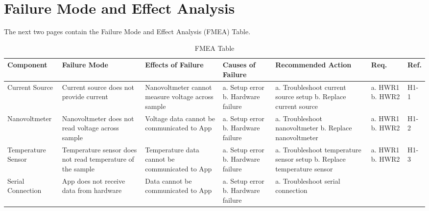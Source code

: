 \documentclass{article}
\begin{document}
\section{Failure Mode and Effect Analysis}
The next two pages contain the Failure Mode and Effect Analysis (FMEA) Table.

\begin{landscape}
\begin{table}[h]
  \centering
  \caption{FMEA Table}
  \label{my-label}
  \begin{tabular}{|P{20mm}|P{30mm}|P{30mm}|P{30mm}|P{35mm}|P{20mm}|P{10mm}|}
    \hline
    \textbf{Component} & \textbf{Failure Mode} & \textbf{Effects of Failure} & \textbf{Causes of Failure} & \textbf{Recommended Action} & \textbf{Req.} & \textbf{Ref.}      \\ \hline
    Current Source
    & Current source does not provide current 
    & Nanovoltmeter cannot measure voltage across sample
    & a. Setup error \newline
      b. Hardware failure
    & a. Troubleshoot current source setup \newline
      b. Replace current source
    & a. HWR1 \newline
      b. HWR2
    & H1-1      \\ \hline
    Nanovoltmeter
    & Nanovoltmeter does not read voltage across sample
    & Voltage data cannot be communicated to App
    & a. Setup error \newline
      b. Hardware failure
    & a. Troubleshoot nanovoltmeter \newline
      b. Replace nanovoltmeter
    & a. HWR1 \newline
      b. HWR2
    & H1-2      \\ \hline
    Temperature Sensor
    & Temperature sensor does not read temperature of the sample
    & Temperature data cannot be communicated to App
    & a. Setup error \newline
      b. Hardware failure
    & a. Troubleshoot temperature sensor setup \newline
      b. Replace temperature sensor 
    & a. HWR1 \newline
      b. HWR2
    & H1-3    \\ \hline
    Serial Connection
    & App does not receive data from hardware
    & Data cannot be communicated to App
    & a. Setup error \newline
      b. Hardware failure
    & a. Troubleshoot serial connection \newline

\end{tabular}
\end{table}
\end{landscape}
\end{document}
